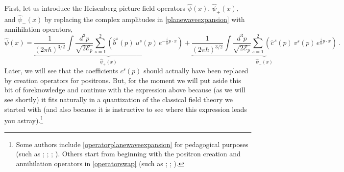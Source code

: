 \documentclass[onecolumn,secnumarabic,amsmath,amssymb,balancelastpage,nofootinbib]{article}
\begin{document}
First, let us introduce the Heisenberg picture field operators $\widehat{\psi} (x)$, $\widehat{\psi}_+(x)$, and $\widehat{\psi}_-(x)$ by replacing the complex amplitudes in \eqref{planewaveexpansion} with annihilation operators,
\begin{equation}
\widehat{\psi} (x) = \underbrace{\frac{1}{(2\pi\hbar)^{3/2}}\int{ \frac{d^3 p}{\sqrt{2 \mathcal{E}_p}} \sum_{s=1}^2 \left(\widehat{b}^s (p) \: u^s (p) \, e^{-\frac{i}{\hbar} p \cdot x}\right)}}_{\mbox{$\widehat{\psi}_+(x)$}}
+\underbrace{\frac{1}{(2\pi\hbar)^{3/2}}\int{ \frac{d^3 p}{\sqrt{2 \mathcal{E}_p}} \sum_{s=1}^2 \left(\widehat{c}^{\,s} (p) \: v^s (p) \,  e^{\frac{i}{\hbar} p \cdot x}\right)}}_{\mbox{$\widehat{\psi}_-(x)$}}
\ .
\label{operatorplanewaveexpansion}
\end{equation}
Later, we will see that the coefficients $c^s (p)$ should actually have been replaced by creation operators for positrons.  But, for the moment we will put aside this bit of foreknowledge and continue with the expression above because (as we will see shortly) it fits naturally in a quantization of the classical field theory we started with (and also because it is instructive to see where this expression leads you astray).\footnote{Some authors include \eqref{operatorplanewaveexpansion} for pedagogical purposes (such as \citealp[sec.\ 8a]{schweberQFT}; \citealp[sec.\ 3.5]{peskinschroeder}; \citealp[sec.\ 5.3]{greiner1996}; \citealp[ch.\ 5]{tong}).  Others start from beginning with the positron creation and annihilation operators in \eqref{operatorswap} (such as \citealp[pg.\ 70]{hatfield}; \citealp[pg.\ 138]{ryder}; \citealp[pg.\ 211]{schwartz}).}
\end{document}
